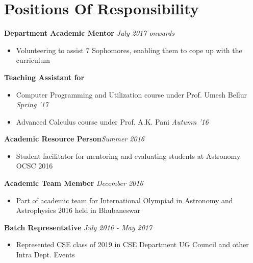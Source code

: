 \documentclass[a4paper,10pt]{article}
\begin{document}
\section{Positions Of Responsibility}
\textbf{Department Academic Mentor} \hfill \textit{July 2017 onwards}
\begin{itemize}
    \item Volunteering to assist 7 Sophomores, enabling them to cope up with the curriculum
\end{itemize}
\textbf{Teaching Assistant for}
\begin{itemize}
    \item Computer Programming and Utilization course under Prof. Umesh Bellur \hfill \textit{Spring '17}
    \item Advanced Calculus course under Prof. A.K. Pani \hfill \textit{Autumn '16}
\end{itemize}
\textbf{Academic Resource Person}\hfill\textit{Summer 2016}
\begin{itemize}
    \item Student facilitator for mentoring and evaluating students at Astronomy OCSC 2016
\end{itemize}
\textbf{Academic Team Member} \hfill \textit{December 2016}
\begin{itemize}
    \item Part of academic team for International Olympiad in Astronomy and Astrophysics 2016 held in Bhubaneswar
\end{itemize}
\textbf{Batch Representative} \hfill \textit{July 2016 - May 2017}
\begin{itemize}
    \item Represented CSE class of 2019 in CSE Department UG Council and other Intra Dept. Events
\end{itemize}
\vspace{-5pt}
\end{document}
